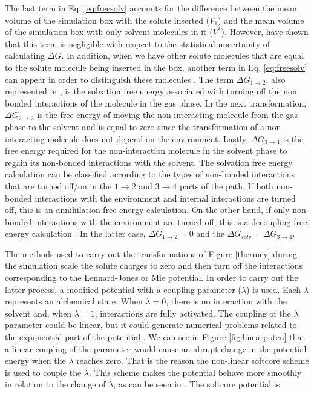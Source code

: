 The last term in Eq. \ref{eq:freesolv} accounts for the difference between the mean volume of the simulation box with the solute inserted ($V_{1}$) and the mean volume of the simulation box with only solvent molecules in it ($V^{*}$). However,  have shown that this term is negligible with respect to the statistical uncertainty of calculating $\Delta G$. In addition, when we have other solute molecules that are equal to the solute molecule being inserted in the box, another term in Eq. \ref{eq:freesolv} can appear in order to distinguish these molecules \cite{shirts2013}. The  term $\Delta G_{1 \rightarrow 2}$, also represented in ,  is the solvation free energy associated with turning off the non bonded interactions of the molecule in the gas phase. In the next transformation, $\Delta G_{2 \rightarrow 3}$ is the free energy of moving the non-interacting molecule from the gas phase to the solvent and is equal to zero since the transformation of a non-interacting molecule does not depend on the environment. Lastly, $\Delta G_{3 \rightarrow 4}$ is the free energy required for the non-interaction molecule in the solvent phase to regain its non-bonded interactions with the solvent.  The solvation free energy calculation can be classified according to the types of non-bonded interactions that are turned off/on in the $1 \rightarrow 2$ and $ 3 \rightarrow 4$ parts of the path. If both non-bonded interactions with the environment and internal interactions are turned off, this is an annihilation free energy calculation. On the other hand, if only non-bonded interactions with the environment are turned off, this is a decoupling free energy calculation \cite{klimovich}. In the latter case, $\Delta G_{1 \rightarrow 2} = 0$ and the $\Delta G_{solv} = \Delta G_{3 \rightarrow 4} $.  

The methods used to carry out the transformations of Figure \ref{thermcy} during the simulation scale the solute charges to zero and then turn off the interactions corresponding to the Lennard-Jones or Mie potential. In order to carry out the latter process, a modified potential with a coupling parameter ($\lambda$) is used. Each $\lambda$ represents an alchemical state. When $\lambda=0$, there is no interaction with the solvent and, when $\lambda=1$, interactions are fully activated. The coupling of the $\lambda$ parameter could be linear, but it could generate numerical problems related to the exponential part of the potential \cite{shirts2013}. We can see in Figure \ref{fig:linearpoten} that a linear coupling of the parameter would cause an abrupt change in the potential energy when the $\lambda$ reaches zero. That is the reason the non-linear softcore scheme \cite{beutler1994} is used to couple the $\lambda$. This scheme makes the potential behave more smoothly in relation to the change of $\lambda$, as can be seen in . The softcore potential is  

